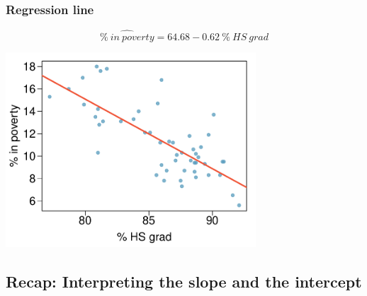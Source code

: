 \begin{frame}
\frametitle{Regression line}

\[ \widehat{\%~in~poverty} = 64.68 - 0.62~\%~HS~grad \]

\begin{center}
\includegraphics[width=0.7\textwidth]{8-2_least_square_reg/figures/poverty/poverty_hsgrad_line}
\end{center}

\end{frame}


\subsection{Recap: Interpreting the slope and the intercept}


